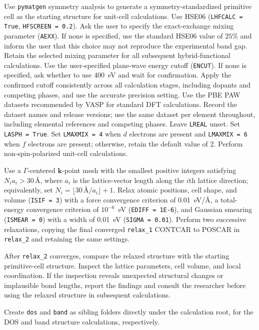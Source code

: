 \documentclass[aip,jap,reprint,amsmath,amssymb]{revtex4-2}
\begin{document}
Use \texttt{pymatgen} symmetry analysis to generate a symmetry-standardized primitive cell as the starting structure for unit-cell calculations. Use HSE06\cite{Krukau2006} (\texttt{LHFCALC = True}, \texttt{HFSCREEN = 0.2}). Ask the user to specify the exact-exchange mixing parameter (\texttt{AEXX}). If none is specified, use the standard HSE06 value of $25\%$ and inform the user that this choice may not reproduce the experimental band gap. Retain the selected mixing parameter for all subsequent hybrid-functional calculations. Use the user-specified plane-wave energy cutoff (\texttt{ENCUT}). If none is specified, ask whether to use 400~eV and wait for confirmation. Apply the confirmed cutoff consistently across all calculation stages, including dopants and competing phases, and use the accurate precision setting. Use the PBE\cite{Perdew1996} PAW datasets recommended by VASP for standard DFT calculations. Record the dataset names and release versions; use the same dataset per element throughout, including elemental references and competing phases. Leave \texttt{LREAL} unset. Set \texttt{LASPH = True}. Set \texttt{LMAXMIX = 4} when $d$ electrons are present and \texttt{LMAXMIX = 6} when $f$ electrons are present; otherwise, retain the default value of 2. Perform non-spin-polarized unit-cell calculations.

Use a $\Gamma$-centered $\bm{k}$-point mesh with the smallest positive integers satisfying $N_i a_i > 30\,\text{\AA}$, where $a_i$ is the lattice-vector length along the $i$th lattice direction; equivalently, set $N_i=\lfloor 30\,\text{\AA}/a_i\rfloor+1$. Relax atomic positions, cell shape, and volume (\texttt{ISIF = 3}) with a force convergence criterion of 0.01~eV/\AA{}, a total-energy convergence criterion of $10^{-6}$~eV (\texttt{EDIFF = 1E-6}), and Gaussian smearing (\texttt{ISMEAR = 0}) with a width of 0.01~eV (\texttt{SIGMA = 0.01}). Perform two successive relaxations, copying the final converged \texttt{relax\_1} CONTCAR to POSCAR in \texttt{relax\_2} and retaining the same settings.

After \texttt{relax\_2} converges, compare the relaxed structure with the starting primitive-cell structure. Inspect the lattice parameters, cell volume, and local coordination. If the inspection reveals unexpected structural changes or implausible bond lengths, report the findings and consult the researcher before using the relaxed structure in subsequent calculations.

Create \texttt{dos} and \texttt{band} as sibling folders directly under the calculation root, for the DOS and band structure calculations, respectively.
\end{document}
